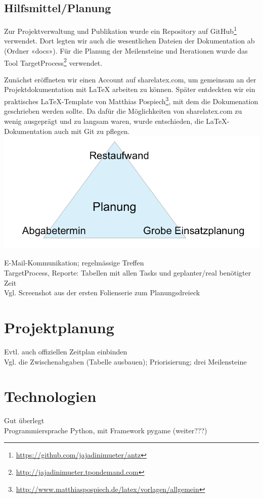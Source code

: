 \vspace*{1cm}


\subsection{Hilfsmittel/Planung}

Zur Projektverwaltung und Publikation wurde ein Repository auf GitHub\footnote{\url{https://github.com/jajadinimueter/antz}} verwendet. Dort legten wir auch die wesentlichen Dateien der Dokumentation ab (Ordner «docs»). Für die Planung der Meilensteine und Iterationen wurde das Tool TargetProcess\footnote{\url{http://jajadinimueter.tpondemand.com}} verwendet.


\vspace*{1cm}

Zunächst eröffneten wir einen Account auf sharelatex.com, um gemeinsam an der Projektdokumentation mit LaTeX arbeiten zu können. Später entdeckten wir ein praktisches LaTeX-Template von Matthias Pospiech\footnote{\url{http://www.matthiaspospiech.de/latex/vorlagen/allgemein}}, mit dem die Dokumenation geschrieben werden sollte. Da dafür die Möglichkeiten von sharelatex.com zu wenig ausgeprägt und zu langsam waren, wurde entschieden, die LaTeX-Dokumentation auch mit Git zu pflegen. \\


\includegraphics [width=14cm]{images/Planungsdreieck_Quelle.png} 


E-Mail-Kommunikation; regelmässige Treffen \\

TargetProcess, Reporte: Tabellen mit allen Tasks und geplanter/real benötigter Zeit \\

Vgl. Screenshot aus der ersten Folienserie zum Planungsdreieck \\






\section*{Projektplanung}

Evtl. auch offiziellen Zeitplan einbinden \\

Vgl. die Zwischenabgaben (Tabelle ausbauen); Priorisierung; drei Meilensteine \\


\vspace*{1cm}


\section{Technologien}

Gut überlegt \\

Programmiersprache Python, mit Framework pygame (weiter???)

